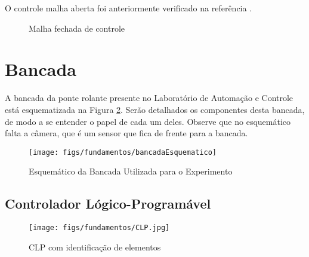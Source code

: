O controle malha aberta foi anteriormente verificado na referência \cite{redytton}.
\begin{figure}[!ht]
\centering
\caption{Malha fechada de controle\label{mfechadatikz}}
\end{figure}

\section{Bancada}
A bancada da ponte rolante presente no Laboratório de Automação e Controle está esquematizada na Figura \ref{bancadaEsquematico}. Serão detalhados os componentes desta bancada, de modo a se entender o papel de cada um deles. Observe que no esquemático falta a câmera, que é um sensor que fica de frente para a bancada. 

\begin{figure}[hbt]
\centering
  \texttt{[image: figs/fundamentos/bancadaEsquematico]}
  \caption{Esquemático da Bancada Utilizada para o Experimento \cite{redytton}\label{bancadaEsquematico}}
\end{figure}

\subsection{Controlador Lógico-Programável}
\begin{figure}[!ht]
  \centering
    \texttt{[image: figs/fundamentos/CLP.jpg]}
    \caption{CLP com identificação de elementos\label{CLPcomentado}}
\end{figure}

